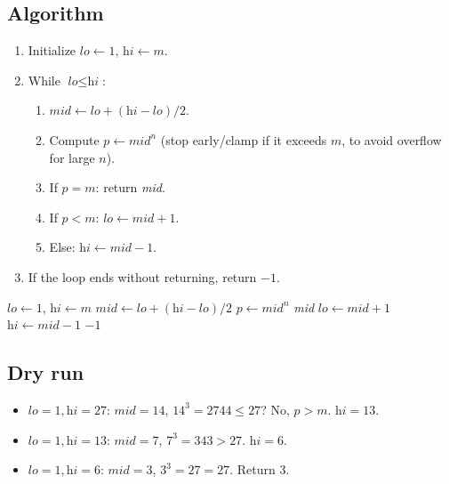 \subsection*{Algorithm}

\begin{enumerate}
  \item Initialize $\textit{lo} \gets 1$, $\textit{hi} \gets m$.
  \item While $\textit{lo} \le \textit{hi}$:
  \begin{enumerate}
    \item $\textit{mid} \gets \textit{lo}+(\textit{hi}-\textit{lo})/2$.
    \item Compute $p \gets \textit{mid}^n$ (stop early/clamp if it exceeds
          $m$, to avoid overflow for large $n$).
    \item If $p = m$: return \textit{mid}.
    \item If $p < m$: $\textit{lo} \gets \textit{mid}+1$.
    \item Else: $\textit{hi} \gets \textit{mid}-1$.
  \end{enumerate}
  \item If the loop ends without returning, return $-1$.
\end{enumerate}

\begin{algorithm}[H]
\caption{Nth Root}
\begin{algorithmic}[1]
  \State $\textit{lo} \gets 1$, $\textit{hi} \gets m$
    \State $\textit{mid} \gets \textit{lo}+(\textit{hi}-\textit{lo})/2$
    \State $p \gets \textit{mid}^n$ 
     \Return \textit{mid} \EndIf
      \State $\textit{lo} \gets \textit{mid} + 1$
    \Else
      \State $\textit{hi} \gets \textit{mid} - 1$
    \EndIf
  \EndWhile
  \State \Return $-1$
\EndProcedure
\end{algorithmic}
\end{algorithm}

\subsection*{Dry run}


\begin{itemize}
  \item $\textit{lo}=1,\textit{hi}=27$: $\textit{mid}=14$, $14^3=2744 \le
        27$? No, $p > m$. $\textit{hi}=13$.
  \item $\textit{lo}=1,\textit{hi}=13$: $\textit{mid}=7$, $7^3=343 > 27$.
        $\textit{hi}=6$.
  \item $\textit{lo}=1,\textit{hi}=6$: $\textit{mid}=3$, $3^3=27=27$.
        Return $3$.
\end{itemize}

